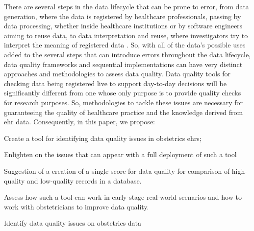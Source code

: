 There are several steps in the data lifecycle that can be prone to error, from data generation, where the data is registered by healthcare professionals, passing by data processing, whether inside healthcare institutions or by software engineers aiming to reuse data, to data interpretation and reuse, where investigators try to interpret the meaning of registered data \cite{wengClinicalDataQuality2020}.
So, with all of the data's possible uses added to the several steps that can introduce errors throughout the data lifecycle, data quality frameworks and sequential implementations can have very distinct approaches and methodologies to assess data quality. Data quality tools for checking data being registered live to support day-to-day decisions will be significantly different from one whose only purpose is to provide quality checks for research purposes. So, methodologies to tackle these issues are necessary for guaranteeing the quality of healthcare practice and the knowledge derived from \ac{ehr} data. Consequently, in this paper, we propose:
\begin{myitemize}
    \item Create a tool for identifying data quality issues in obstetrics \acp{ehr};
    \item Enlighten on the issues that can appear with a full deployment of such a tool
    \item Suggestion of a creation of a single score for data quality for comparison of high-quality and low-quality records in a database.
    \item Assess how such a tool can work in early-stage real-world scenarios and how to work with obstetricians to improve data quality.
    \item Identify data quality issues on obstetrics data
\end{myitemize}




